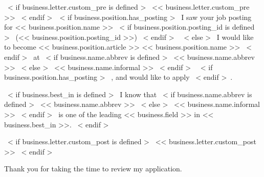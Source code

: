 ~< if business.letter.custom_pre is defined >~
  << business.letter.custom_pre >>%
~< endif >~~< if business.position.has_posting >~%
I saw your job posting for << business.position.name >>
    ~< if business.position.posting_id is defined >~ (<< business.position.posting_id >>) ~< endif >~
~< else >~
    I would like to become << business.position.article >> << business.position.name >>
~< endif >~
at 
~< if business.name.abbrev is defined >~
    << business.name.abbrev >>%
~< else >~
    << business.name.informal >>%
~< endif >~
~< if business.position.has_posting >~
    , and would like to apply%
~< endif >~.

~< if business.best_in is defined >~
    I know that
    ~< if business.name.abbrev is defined >~
        << business.name.abbrev >>
    ~< else >~
        << business.name.informal >>
    ~< endif >~
    is one of the leading << business.field >> in << business.best_in >>.
~< endif >~



~< if business.letter.custom_post is defined >~
  << business.letter.custom_post >>
~< endif >~

Thank you for taking the time to review my application.
